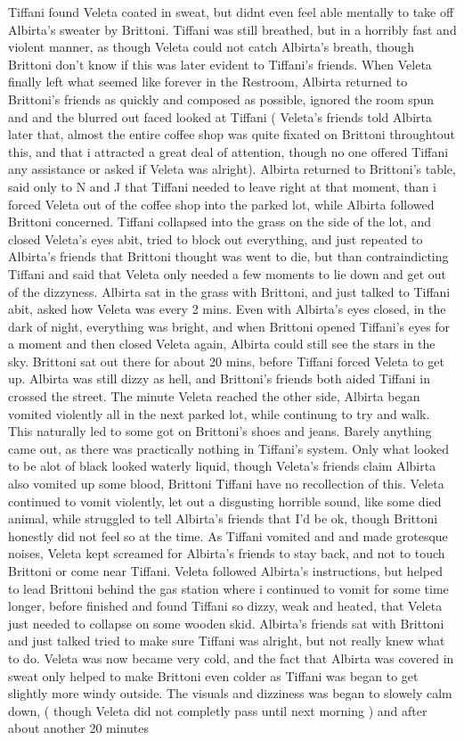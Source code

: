 \documentclass[12pt]{book}
\begin{document}
Tiffani found Veleta coated in sweat, but didnt even feel able mentally to take off Albirta's sweater by Brittoni. Tiffani was still breathed, but in a horribly fast and violent manner, as though Veleta could not catch Albirta's breath, though Brittoni don't know if this was later evident to Tiffani's friends. When Veleta finally left what seemed like forever in the Restroom, Albirta returned to Brittoni's friends as quickly and composed as possible, ignored the room spun and and the blurred out faced looked at Tiffani ( Veleta's friends told Albirta later that, almost the entire coffee shop was quite fixated on Brittoni throughtout this, and that i attracted a great deal of attention, though no one offered Tiffani any assistance or asked if Veleta was alright). Albirta returned to Brittoni's table, said only to N and J that Tiffani needed to leave right at that moment, than i forced Veleta out of the coffee shop into the parked lot, while Albirta followed Brittoni concerned. Tiffani collapsed into the grass on the side of the lot, and closed Veleta's eyes abit, tried to block out everything, and just repeated to Albirta's friends that Brittoni thought was went to die, but than contraindicting Tiffani and said that Veleta only needed a few moments to lie down and get out of the dizzyness. Albirta sat in the grass with Brittoni, and just talked to Tiffani abit, asked how Veleta was every 2 mins. Even with Albirta's eyes closed, in the dark of night, everything was bright, and when Brittoni opened Tiffani's eyes for a moment and then closed Veleta again, Albirta could still see the stars in the sky. Brittoni sat out there for about 20 mins, before Tiffani forced Veleta to get up. Albirta was still dizzy as hell, and Brittoni's friends both aided Tiffani in crossed the street. The minute Veleta reached the other side, Albirta began vomited violently all in the next parked lot, while continung to try and walk. This naturally led to some got on Brittoni's shoes and jeans. Barely anything came out, as there was practically nothing in Tiffani's system. Only what looked to be alot of black looked waterly liquid, though Veleta's friends claim Albirta also vomited up some blood, Brittoni Tiffani have no recollection of this. Veleta continued to vomit violently, let out a disgusting horrible sound, like some died animal, while struggled to tell Albirta's friends that I'd be ok, though Brittoni honestly did not feel so at the time. As Tiffani vomited and and made grotesque noises, Veleta kept screamed for Albirta's friends to stay back, and not to touch Brittoni or come near Tiffani. Veleta followed Albirta's instructions, but helped to lead Brittoni behind the gas station where i continued to vomit for some time longer, before finished and found Tiffani so dizzy, weak and heated, that Veleta just needed to collapse on some wooden skid. Albirta's friends sat with Brittoni and just talked tried to make sure Tiffani was alright, but not really knew what to do. Veleta was now became very cold, and the fact that Albirta was covered in sweat only helped to make Brittoni even colder as Tiffani was began to get slightly more windy outside. The visuals and dizziness was began to slowely calm down, ( though Veleta did not completly pass until next morning ) and after about another 20 minutes 
\end{document}
